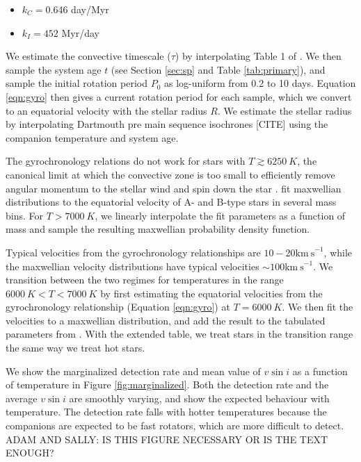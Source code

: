 \documentclass{emulateapj}
\begin{document}
\begin{itemize}
\item $k_C = 0.646$ day/Myr
\item $k_I = 452$ Myr/day
\end{itemize}
We estimate the convective timescale ($\tau$) by interpolating Table 1 of \citet{Barnes2010a}. We then sample the system age $t$ (see Section \ref{sec:sp} and Table \ref{tab:primary}), and sample the initial rotation period $P_0$ as log-uniform from 0.2 to 10 days. Equation \ref{eqn:gyro} then gives a current rotation period for each sample, which we convert to an equatorial velocity with the stellar radius $R$. We estimate the stellar radius by interpolating Dartmouth pre main sequence isochrones [CITE] using the companion temperature and system age. 

The gyrochronology relations do not work for stars with $T \gtrsim 6250\ K$, the canonical limit at which the convective zone is too small to efficiently remove angular momentum to the stellar wind and spin down the star \citep{Pinsonneault2001}. \citet{Zorec2012} fit maxwellian distributions to the equatorial velocity of A- and B-type stars in several mass bins. For $T > 7000\ K$, we linearly interpolate the fit parameters as a function of mass and sample the resulting maxwellian probability density function. 

Typical velocities from the gyrochronology relationships are $10-20 \mathrm{km\ s}^{-1}$, while the maxwellian velocity distributions have typical velocities $\sim 100 \mathrm{km\ s}^{-1}$. We transition between the two regimes for temperatures in the range $6000\ K < T < 7000\ K$ by first estimating the equatorial velocities from the gyrochronology relationship (Equation \ref{eqn:gyro}) at $T=6000\ K$. We then fit the velocities to a maxwellian distribution, and add the result to the tabulated parameters from \citep{Zorec2012}. With the extended table, we treat stars in the transition range the same way we treat hot stars.
 
We show the marginalized detection rate and mean value of $v\sin{i}$ as a function of temperature in Figure \ref{fig:marginalized}. Both the detection rate and the average $v\sin{i}$ are smoothly varying, and show the expected behaviour with temperature. The detection rate falls with hotter temperatures because the companions are expected to be fast rotators, which are more difficult to detect. ADAM AND SALLY: IS THIS FIGURE NECESSARY OR IS THE TEXT ENOUGH?
\end{document}
